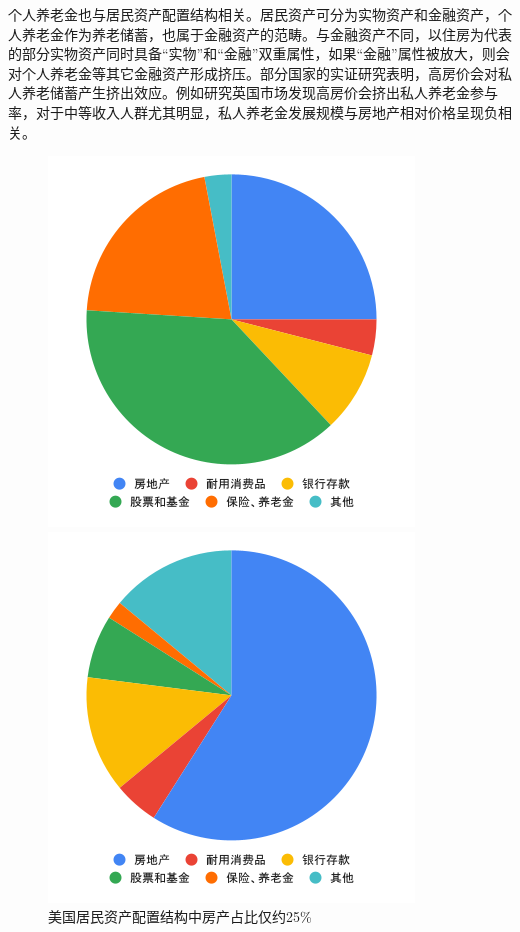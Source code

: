 \documentclass[a4paper,zihao=5]{ctexart}
\begin{document}
个人养老金也与居民资产配置结构相关。居民资产可分为实物资产和金融资产，个人养老金作为养老储蓄，也属于金融资产的范畴。与金融资产不同，以住房为代表的部分实物资产同时具备“实物”和“金融”双重属性，如果“金融”属性被放大，则会对个人养老金等其它金融资产形成挤压。部分国家的实证研究表明，高房价会对私人养老储蓄产生挤出效应。例如\citet{crawford2020impact}研究英国市场发现高房价会挤出私人养老金参与率，对于中等收入人群尤其明显，私人养老金发展规模与房地产相对价格呈现负相关。
\begin{figure}[H]
    \centering
    \begin{minipage}{0.48\linewidth}
        \includegraphics[width=\linewidth]{img/us.png}
        \caption{美国居民资产配置结构中房产占比仅约25\%}
    \end{minipage}
    \begin{minipage}{0.48\linewidth}
        \includegraphics[width=\linewidth]{img/cn.png}

\end{minipage}
\end{figure}
\end{document}
